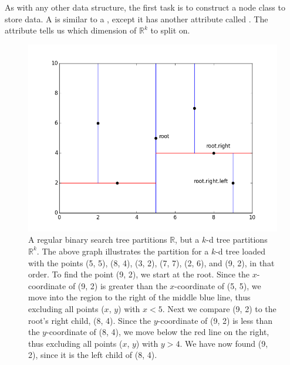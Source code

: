 As with any other data structure, the first task is to construct a node class to store data.
A  is similar to a , except it has another attribute called .
The  attribute tells us which dimension of $\mathbb{R}^k$ to split on.


\begin{figure}[H]
\includegraphics[width=\textwidth]{figures/kdpic1.png}
\caption{A regular binary search tree partitions $\mathbb{R}$, but a $k$-d tree partitions $\mathbb{R}^{k}$. The above graph illustrates the partition for a $k$-d tree loaded with the points (5, 5), (8, 4), (3, 2), (7, 7), (2, 6), and (9, 2), in that order. To find the point (9, 2), we start at the root. Since the $x$-coordinate of (9, 2) is greater than the $x$-coordinate of (5, 5), we move into the region to the right of the middle blue line, thus excluding all points ($x$, $y$) with $x < 5$. Next we compare (9, 2) to the root's right child, (8, 4). Since the $y$-coordinate of (9, 2) is less than the $y$-coordinate of (8, 4), we move below the red line on the right, thus excluding all points ($x$, $y$) with $y > 4$. We have now found (9, 2), since it is the left child of (8, 4).}
\label{fig:k-binary-search}
\end{figure}

